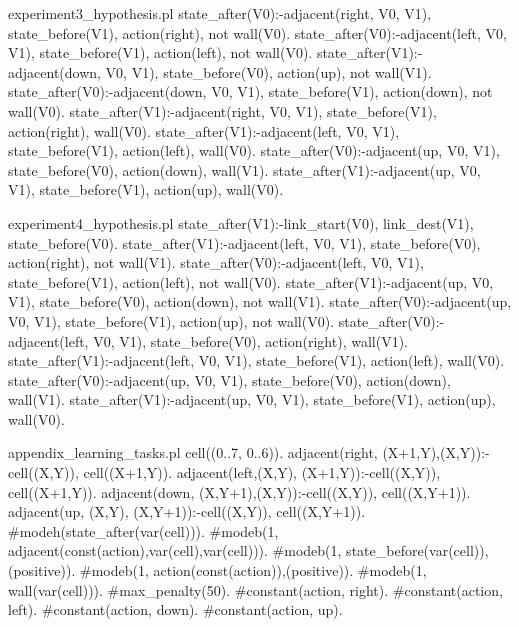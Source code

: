 \begin{filecontents*}{experiment3_hypothesis.pl}
state_after(V0):-adjacent(right, V0, V1), state_before(V1), 
                 action(right), not wall(V0).
state_after(V0):-adjacent(left, V0, V1), state_before(V1), 
                 action(left), not wall(V0).
state_after(V1):-adjacent(down, V0, V1), state_before(V0), 
                 action(up), not wall(V1).
state_after(V0):-adjacent(down, V0, V1), state_before(V1), 
                 action(down), not wall(V0).
state_after(V1):-adjacent(right, V0, V1), state_before(V1), 
                 action(right), wall(V0).
state_after(V1):-adjacent(left, V0, V1), state_before(V1), 
                 action(left), wall(V0).
state_after(V0):-adjacent(up, V0, V1), state_before(V0), 
                 action(down), wall(V1).
state_after(V1):-adjacent(up, V0, V1), state_before(V1), 
                 action(up), wall(V0).
\end{filecontents*}
  
\begin{filecontents*}{experiment4_hypothesis.pl}
state_after(V1):-link_start(V0), link_dest(V1), 
                 state_before(V0).
state_after(V1):-adjacent(left, V0, V1), state_before(V0), 
                 action(right), not wall(V1).
state_after(V0):-adjacent(left, V0, V1), state_before(V1), 
                 action(left), not wall(V0).
state_after(V1):-adjacent(up, V0, V1), state_before(V0), 
                 action(down), not wall(V1).
state_after(V0):-adjacent(up, V0, V1), state_before(V1), 
                 action(up), not wall(V0).
state_after(V0):-adjacent(left, V0, V1), state_before(V0), 
                 action(right), wall(V1).
state_after(V1):-adjacent(left, V0, V1), state_before(V1), 
                 action(left), wall(V0).
state_after(V0):-adjacent(up, V0, V1), state_before(V0), 
                 action(down), wall(V1).
state_after(V1):-adjacent(up, V0, V1), state_before(V1), 
                 action(up), wall(V0).  
\end{filecontents*}

\begin{filecontents*}{appendix_learning_tasks.pl}
cell((0..7, 0..6)).
adjacent(right, (X+1,Y),(X,Y)):-cell((X,Y)), cell((X+1,Y)).
adjacent(left,(X,Y),  (X+1,Y)):-cell((X,Y)), cell((X+1,Y)).
adjacent(down, (X,Y+1),(X,Y)):-cell((X,Y)), cell((X,Y+1)).
adjacent(up,   (X,Y),  (X,Y+1)):-cell((X,Y)), cell((X,Y+1)).
#modeh(state_after(var(cell))).
#modeb(1, adjacent(const(action),var(cell),var(cell))).
#modeb(1, state_before(var(cell)),(positive)).
#modeb(1, action(const(action)),(positive)).
#modeb(1, wall(var(cell))).
#max_penalty(50).
#constant(action, right).
#constant(action, left).
#constant(action, down).
#constant(action, up).
\end{filecontents*}

